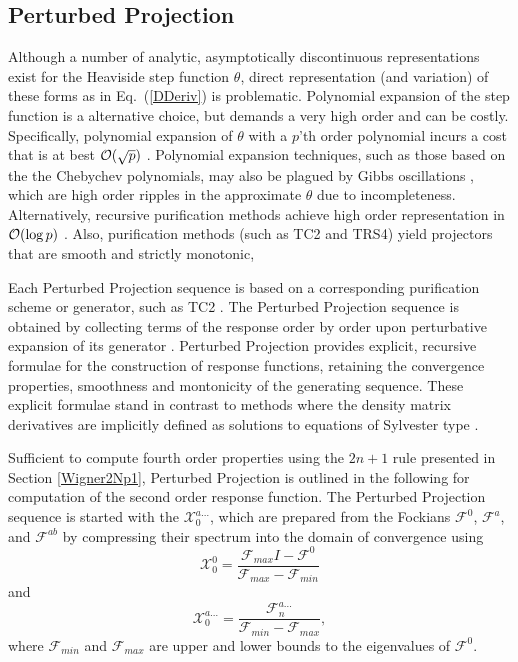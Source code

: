 \documentclass[prl,aps,preprint,showpacs,superbib]{revtex4}
\def\F{\mathcal{F}}
\def\X{\mathcal{X}}
\begin{document}
\subsection{Perturbed Projection}\label{ResponseFunctions}

Although a number of analytic, asymptotically discontinuous representations exist for the Heaviside 
step function $\theta$, direct representation (and variation) of these forms as in Eq.~(\ref{DDeriv}) 
is problematic. Polynomial expansion of the step function is a alternative choice, but demands a very high 
order and can be costly.  Specifically, polynomial expansion of $\theta$ with a $p$'th order polynomial 
incurs a cost that is at best ${\cal O}(\sqrt{p})$ \cite{WLiang04}.  Polynomial expansion techniques,
such as those based on the the Chebychev polynomials, may also be plagued by Gibbs oscillations \cite{AVoter96},
which are high order ripples in the approximate $\theta$ due to incompleteness.
Alternatively, recursive purification methods achieve high order representation in 
${\cal O}( \log p )$ \cite{ANiklasson03}.  Also, purification methods (such as TC2 and TRS4) 
yield projectors that are smooth and strictly monotonic,  

Each Perturbed Projection sequence is based on a corresponding  purification scheme or generator, such as TC2 \cite{ANiklasson02A}.   
The Perturbed Projection sequence is obtained by collecting terms of the response order by 
order upon perturbative expansion of its generator \cite{ANiklasson04}.
Perturbed Projection provides explicit, recursive formulae 
for the construction of response functions, retaining the convergence properties,  smoothness and 
montonicity of the generating sequence.   These explicit formulae stand in contrast to methods where the 
density matrix derivatives are implicitly defined as solutions to equations of Sylvester type \cite{Ochsenfeld97,HLarsen01a,COchsenfeld04}.

Sufficient to compute fourth order properties using the $2 n+1$ rule presented in Section \ref{Wigner2Np1}, 
Perturbed Projection is outlined in the following for computation of the second order response function.  
The Perturbed Projection sequence is started with the  $\X^{a\ldots}_{0}$, which are 
prepared from the Fockians $\F^0$, $\F^a$, and $\F^{ab}$ by  compressing their spectrum into the domain of 
convergence \cite{ANiklasson02A} using
\begin{equation}
    \X^0_{0}=\frac{\F_{max}I-\F^0}{\F_{max}-\F_{min}} 
\end{equation}
and 
\begin{equation}
    \X^{a\ldots}_{0}=\frac{\F^{a\ldots}_{n}}{\F_{min}-\F_{max}},
\end{equation}
where $\F_{min}$ and $\F_{max}$ are upper and lower bounds to the eigenvalues of $\F^0$.  
\end{document}

